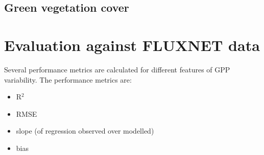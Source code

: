 \documentclass{myreport}
\begin{document}


\subsection{Green vegetation cover}


\section{Evaluation against FLUXNET data}

Several performance metrics are calculated for different features of GPP variability. The performance metrics are:
\begin{itemize}
    \item R$^2$
    \item RMSE
    \item slope (of regression observed over modelled)
    \item bias
\end{itemize}
\end{document}
